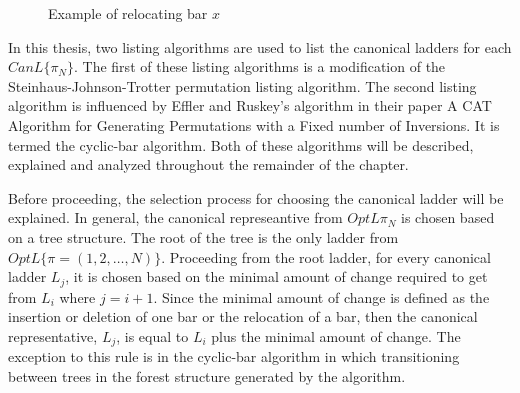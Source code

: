 \begin{figure}[!htp]
    \centering
    \caption{Example of relocating bar $x$}
    \label{fig:bar-relocation}   
\end{figure}

In this thesis, two listing algorithms are used to list the canonical 
ladders for each $CanL\{\pi_{N}\}$. The first of these listing algorithms 
is a modification of the Steinhaus-Johnson-Trotter permutation listing algorithm. 
The second listing algorithm is influenced by Effler and Ruskey's algorithm in their paper 
A CAT Algorithm for Generating Permutations with a Fixed number of Inversions. 
It is termed the cyclic-bar algorithm. Both of these algorithms will 
be described, explained and analyzed throughout the remainder of the chapter.\par

Before proceeding, the selection process for choosing the canonical ladder will be explained.
In general, the canonical represeantive from $OptL{\pi_{N}}$ is chosen based on a tree structure. 
The root of the tree is the only ladder from $OptL\{\pi=(1, 2, \dots  ,N)\}$.
Proceeding from the root ladder, for every canonical ladder $L_{j}$, it 
is chosen based on the minimal amount of change required to get from $L_{i}$ where $j=i+1$. 
Since the minimal amount of change is defined as the insertion or deletion of one bar 
or the relocation of a bar, then the canonical representative, $L_{j}$, is equal 
to $L_{i}$ plus the minimal amount of change. The exception to this rule is 
in the cyclic-bar algorithm in which transitioning between trees in the forest 
structure generated by the algorithm.

